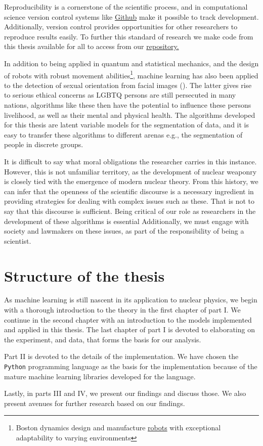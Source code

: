 Reproducibility is a cornerstone of the scientific process, and in computational science version control systems like \href{https://github.com/}{Github} make it possible to track development. Additionally, version control provides opportunities for other researchers to reproduce results easily. To further this standard of research we make code from this thesis available for all to access from our \href{https://github.com/ATTPC/VAE-event-classification}{repository.} 

In addition to being applied in quantum and statistical mechanics, and the design of robots with robust movement abilities\footnote{Boston dynamics design and manufacture \href{https://www.youtube.com/watch?v=LikxFZZO2sk}{robots} with exceptional adaptability to varying environments}, machine learning has also been applied to the detection of sexual orientation from facial images (\citet{Wang2018}). The latter gives rise to serious ethical concerns as LGBTQ persons are still persecuted in many nations, algorithms like these then have the potential to influence these persons livelihood, as well as their mental and physical health. The algorithms developed for this thesis are latent variable models for the segmentation of data, and it is easy to transfer these algorithms to different arenas e.g., the segmentation of people in discrete groups.

It is difficult to say what moral obligations the researcher carries in this instance. However, this is not unfamiliar territory, as the development of nuclear weaponry is closely tied with the emergence of modern nuclear theory. From this history, we can infer that the openness of the scientific discourse is a necessary ingredient in providing strategies for dealing with complex issues such as these. That is not to say that this discourse is sufficient.  Being critical of our role as researchers in the development of these algorithms is essential Additionally, we must engage with society and lawmakers on these issues, as part of the responsibility of being a scientist. 

\section{Structure of the thesis}

As machine learning is still nascent in its application to nuclear physics, we begin with a thorough introduction to the theory in the first chapter of part I. We continue in the second chapter with an introduction to the models implemented and applied in this thesis. The last chapter of part I is devoted to elaborating on the experiment, and data, that forms the basis for our analysis.

Part II is devoted to the details of the implementation. We have chosen the \lstinline{Python} programming language as the basis for the implementation because of the mature machine learning libraries developed for the language. 

Lastly, in parts III and IV, we present our findings and discuss those. We also present avenues for further research based on our findings.
